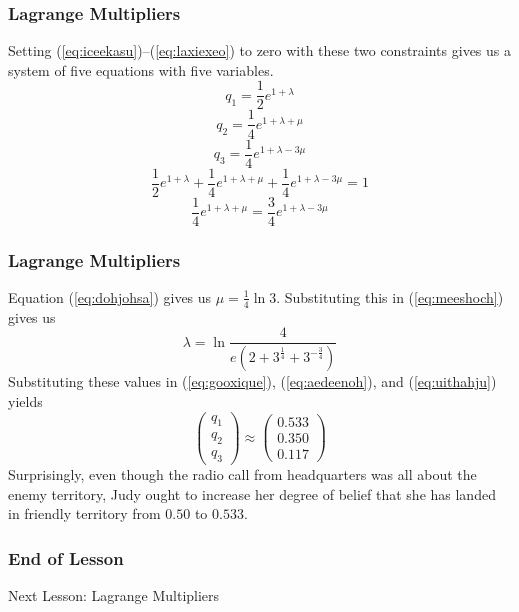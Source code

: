 \documentclass[xcolor=dvipsnames]{beamer}
\begin{document}
\begin{frame}
  \frametitle{Lagrange Multipliers}
  Setting (\ref{eq:iceekasu})--(\ref{eq:laxiexeo}) to zero with these
  two constraints gives us a system of five equations with five
  variables.
  \begin{equation}
    \label{eq:gooxique}
    q_{1}=\frac{1}{2}e^{1+\lambda}
  \end{equation}
  \begin{equation}
    \label{eq:aedeenoh}
    q_{2}=\frac{1}{4}e^{1+\lambda+\mu}
  \end{equation}
  \begin{equation}
    \label{eq:uithahju}
    q_{3}=\frac{1}{4}e^{1+\lambda-3\mu}
  \end{equation}
  \begin{equation}
    \label{eq:meeshoch}
\frac{1}{2}e^{1+\lambda}+\frac{1}{4}e^{1+\lambda+\mu}+\frac{1}{4}e^{1+\lambda-3\mu}=1
  \end{equation}
  \begin{equation}
    \label{eq:dohjohsa}
    \frac{1}{4}e^{1+\lambda+\mu}=\frac{3}{4}e^{1+\lambda-3\mu}
  \end{equation}
\end{frame}

\begin{frame}
  \frametitle{Lagrange Multipliers}
  Equation (\ref{eq:dohjohsa}) gives us $\mu=\frac{1}{4}\ln{}3$. Substituting
  this in (\ref{eq:meeshoch}) gives us
  \begin{equation}
    \label{eq:chuquohv}
    \lambda=\ln\frac{4}{e\left(2+3^{\frac{1}{4}}+3^{-\frac{3}{4}}\right)}
  \end{equation}
Substituting these values in (\ref{eq:gooxique}), (\ref{eq:aedeenoh}),
and (\ref{eq:uithahju}) yields
\begin{equation}
  \label{eq:aibigoib}
  \left(
    \begin{array}{c}
      q_{1} \\
      q_{2} \\
      q_{3}
    \end{array}\right)\approx\left(
    \begin{array}{c}
      0.533 \\
      0.350 \\
      0.117
    \end{array}\right)
\end{equation}
Surprisingly, even though the radio call from headquarters was all
about the enemy territory, Judy ought to increase her degree of belief
that she has landed in friendly territory from $0.50$ to $0.533$.
\end{frame}

\begin{frame}
  \frametitle{End of Lesson}
Next Lesson: Lagrange Multipliers
\end{frame}
\end{document}
